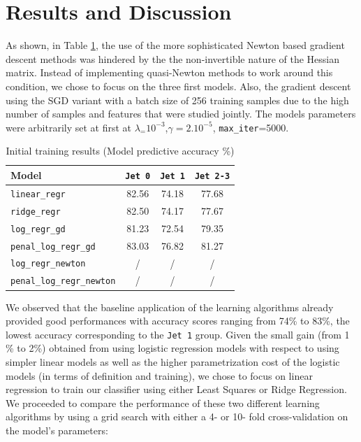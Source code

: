 \documentclass[10pt,conference,compsocconf]{IEEEtran}
\begin{document}
\section{Results and Discussion}
As shown, in Table \ref{tab_first_run}, the use of the more sophisticated Newton based  gradient descent methods was hindered by the the non-invertible nature of the Hessian matrix. Instead of implementing quasi-Newton methods to work around this condition, we chose to focus on the three first models. Also, the gradient descent using the SGD variant with a batch size of 256 training samples due to the high number of samples and features that were studied jointly. The models parameters were arbitrarily set at first at  $\lambda_=10^{-3}$,$\gamma=2.10^{-5}$, \verb+max_iter+=5000. 
\begin{table}[h!]
\centering
\caption{Initial training results (Model predictive accuracy \%)}
\footnotesize
\hspace{-0.3cm}
\begin{tabular}{ l| ccc } 
 \hline
   Model & \verb+Jet 0+& \verb+Jet 1+& \verb+Jet 2-3+ \\
 \hline
   \verb+linear_regr+  & 82.56 &74.18  & 77.68  \\
   \verb+ridge_regr+  & 82.50 & 74.17  & 77.67 \\
   \verb+log_regr_gd+ & 81.23 & 72.54  & 79.35\\
   \verb+penal_log_regr_gd+  &  83.03  &  76.82 & 81.27 \\ 
   \verb+log_regr_newton+  & / & / & / \\
   \verb+penal_log_regr_newton+ &  / & / & / \\
  \hline
\end{tabular}
\label{tab_first_run}
\end{table}
We observed that the baseline application of the learning algorithms already provided good performances with accuracy scores ranging from 74\% to 83\%, the lowest accuracy corresponding to the \verb+Jet 1+ group. Given the small gain (from 1 \% to 2\%) obtained from using logistic regression models with respect to using simpler linear models as well as the higher parametrization cost of the logistic models (in terms of definition and training), we chose to focus on linear regression to train our classifier using either Least Squares or Ridge Regression.
We proceeded to compare the performance of these two  different learning algorithms by using a grid search with either a 4- or 10- fold cross-validation on the model's parameters: 
\end{document}
